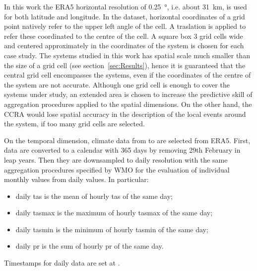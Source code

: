 In this work the ERA5 horizontal resolution of \qty{0.25}{\degree}, i.e. about \qty{31}{\kilo\metre}, is used for both latitude and longitude. In the dataset, horizontal coordinates of a grid point natively refer to the upper left angle of the cell. A traslation is applied to refer these coordinated to the centre of the cell. A square box 3 grid cells wide and centered approximately in the coordinates of the system is chosen for each case study. The systems studied in this work has spatial scale much smaller than the size of a grid cell (see section~\ref{sec:Results}), hence it is guaranteed that the central grid cell encompasses the systems, even if the coordinates of the centre of the system are not accurate. Although one grid cell is enough to cover the systems under study, an extended area is chosen to increase the predictive skill of aggregation procedures applied to the spatial dimensions. On the other hand, the \gls{CCRA} would lose spatial accuracy in the description of the local events around the system, if too many grid cells are selected.

On the temporal dimension, climate data from  to  are selected from ERA5. First, data are converted to a calendar with 365 days by removing 29th February in leap years. Then they are downsampled to daily resolution with the same aggregation procedures specified by \gls{WMO} for the evaluation of individual monthly values from daily values.\cite[5]{2017WorldMeteorologicalOrganizationWMOWMOGuidelines} In particular:
\begin{itemize}
  \item daily \glsdesc{tas} is the mean of hourly \glsdesc{tas} of the same day;
  \item daily \glsdesc{tasmax} is the maximum of hourly \glsdesc{tasmax} of the same day;
  \item daily \glsdesc{tasmin} is the minimum of hourly \glsdesc{tasmin} of the same day;
  \item daily \glsdesc{pr} is the sum of hourly \glsdesc{pr} of the same day.
\end{itemize}
Timestamps for daily data are set at .



